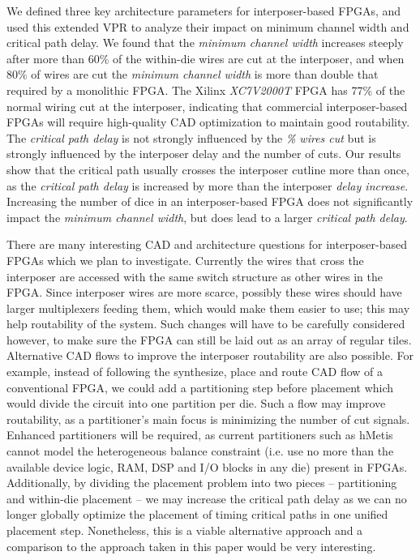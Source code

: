 \documentclass[journal]{IEEEtran}
\begin{document}
We defined three key architecture parameters for interposer-based FPGAs, and used this extended VPR to analyze their impact on minimum channel width and critical path delay. We found that the \textit{minimum channel width} increases steeply after more than 60\% of the within-die wires are cut at the interposer, and when 80\% of wires are cut the \textit{minimum channel width} is more than double that required by a monolithic FPGA. The Xilinx \textit{XC7V2000T} FPGA has 77\% of the normal wiring cut at the interposer, indicating that commercial interposer-based FPGAs will require high-quality CAD optimization to maintain good routability. The \textit{critical path delay} is not strongly influenced by the \textit{\% wires cut} but is strongly influenced by the interposer delay and the number of cuts. Our results show that the critical path usually crosses the interposer cutline more than once, as the \textit{critical path delay} is increased by more than the interposer \textit{delay increase}. Increasing the number of dice in an interposer-based FPGA does not significantly impact the \textit{minimum channel width}, but does lead to a larger \textit{critical path delay}.

There are many interesting CAD and architecture questions for interposer-based FPGAs which we plan to investigate.  Currently the wires that cross the interposer are accessed with the same switch structure as other wires in the FPGA. Since interposer wires are more scarce, possibly these wires should have larger multiplexers feeding them, which would make them easier to use; this may help routability of the system. Such changes will have to be carefully considered however, to make sure the FPGA can still be laid out as an array of regular tiles. Alternative CAD flows to improve the interposer routability are also possible. For example, instead of following the synthesize, place and route CAD flow of a conventional FPGA, we could add a partitioning step before placement which would divide the circuit into one partition per die. Such a flow may improve routability, as a partitioner's main focus is minimizing the number of cut signals. Enhanced partitioners will be required, as current partitioners such as hMetis~\cite{hMetis} cannot model the heterogeneous balance constraint (i.e. use no more than the available device logic, RAM, DSP and I/O blocks in any die) present in FPGAs. Additionally, by dividing the placement problem into two pieces -- partitioning and within-die placement -- we may increase the critical path delay as we can no longer globally optimize the placement of timing critical paths in one unified placement step. Nonetheless, this is a viable alternative approach and a comparison to the approach taken in this paper would be very interesting.
\end{document}
